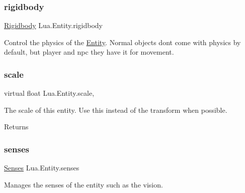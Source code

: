 \subsubsection{\texorpdfstring{rigidbody}{rigidbody}}
{\footnotesize\ttfamily \mbox{\hyperlink{class_lua_1_1_rigidbody}{Rigidbody}} Lua.\+Entity.\+rigidbody\hspace{0.3cm}{\ttfamily [get]}}



Control the physics of the \mbox{\hyperlink{class_lua_1_1_entity}{Entity}}. Normal objects don\textquotesingle{}t come with physics by default, but player and npc they have it for movement. 

\mbox{\label{class_lua_1_1_entity_a784673c0e6fbf29381a309a5df0ee10e}} 
\subsubsection{\texorpdfstring{scale}{scale}}
{\footnotesize\ttfamily virtual float Lua.\+Entity.\+scale\hspace{0.3cm}{\ttfamily [get]}, {\ttfamily [set]}}



The scale of this entity. Use this instead of the transform when possible. 

\begin{DoxyReturn}{Returns}

\end{DoxyReturn}
\mbox{\label{class_lua_1_1_entity_a9a5a67b2da9b9d95e31c766aa68760ee}} 
\subsubsection{\texorpdfstring{senses}{senses}}
{\footnotesize\ttfamily \mbox{\hyperlink{class_lua_1_1_senses}{Senses}} Lua.\+Entity.\+senses\hspace{0.3cm}{\ttfamily [get]}}



Manages the senses of the entity such as the vision. 

\mbox{\label{class_lua_1_1_entity_af00214fc6ff19d22818d8d0810630cea}} 
